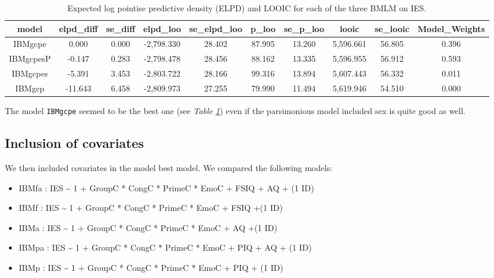 \documentclass[
  11pt,
  english,
  ,doc,floatsintext]{apa6}
\begin{document}
\begin{table}[htb]

\begin{center}
\begin{threeparttable}

\caption{\label{tab:modelCompIES1}Expected log pointise predictive density (ELPD) and LOOIC for each of the three BMLM on IES.}

\tiny{

\begin{tabular}{cccccccccc}
\toprule
model & \multicolumn{1}{c}{elpd\_diff} & \multicolumn{1}{c}{se\_diff} & \multicolumn{1}{c}{elpd\_loo} & \multicolumn{1}{c}{se\_elpd\_loo} & \multicolumn{1}{c}{p\_loo} & \multicolumn{1}{c}{se\_p\_loo} & \multicolumn{1}{c}{looic} & \multicolumn{1}{c}{se\_looic} & \multicolumn{1}{c}{Model\_Weights}\\
\midrule
IBMgcpe & 0.000 & 0.000 & -2,798.330 & 28.402 & 87.995 & 13.260 & 5,596.661 & 56.805 & 0.396\\
IBMgcpesP & -0.147 & 0.283 & -2,798.478 & 28.456 & 88.162 & 13.335 & 5,596.955 & 56.912 & 0.593\\
IBMgcpes & -5.391 & 3.453 & -2,803.722 & 28.166 & 99.316 & 13.894 & 5,607.443 & 56.332 & 0.011\\
IBMgcp & -11.643 & 6.458 & -2,809.973 & 27.255 & 79.990 & 11.494 & 5,619.946 & 54.510 & 0.000\\
\bottomrule
\end{tabular}

}

\end{threeparttable}
\end{center}

\end{table}

The model \texttt{IBMgcpe} seemed to be the best one (see \emph{Table \ref{tab:modelCompIES1}}) even if the parsimonious model included sex is quite good as well.

\hypertarget{inclusion-of-covariates}{%
\subsection{Inclusion of covariates}\label{inclusion-of-covariates}}

We then included covariates in the model best model. We compared the following models:

\begin{itemize}
\item
  IBMfa : IES \textasciitilde{} 1 + GroupC * CongC * PrimeC * EmoC + FSIQ + AQ + (1 \textbar{} ID)
\item
  IBMf : IES \textasciitilde{} 1 + GroupC * CongC * PrimeC * EmoC + FSIQ +(1 \textbar{} ID)
\item
  IBMa : IES \textasciitilde{} 1 + GroupC * CongC * PrimeC * EmoC + AQ +(1 \textbar{} ID)
\item
  IBMpa : IES \textasciitilde{} 1 + GroupC * CongC * PrimeC * EmoC + PIQ + AQ + (1 \textbar{} ID)
\item
  IBMp : IES \textasciitilde{} 1 + GroupC * CongC * PrimeC * EmoC + PIQ + (1 \textbar{} ID)
\end{itemize}
\end{document}
